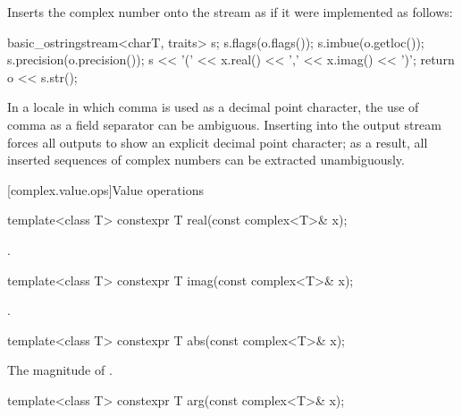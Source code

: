 \begin{itemdescr}
\pnum
\effects
Inserts the complex number 
onto the stream  as if it were implemented as follows:

\begin{codeblock}
basic_ostringstream<charT, traits> s;
s.flags(o.flags());
s.imbue(o.getloc());
s.precision(o.precision());
s << '(' << x.real() << ',' << x.imag() << ')';
return o << s.str();
\end{codeblock}

\pnum
\begin{note}
In a locale in which comma is used as a decimal point character, the
use of comma as a field separator can be ambiguous. Inserting
 into the output stream forces all outputs to
show an explicit decimal point character; as a result, all inserted sequences of
complex numbers can be extracted unambiguously.
\end{note}
\end{itemdescr}

[complex.value.ops]{Value operations}

%
\begin{itemdecl}
template<class T> constexpr T real(const complex<T>& x);
\end{itemdecl}

\begin{itemdescr}
\pnum
\returns
{}.
\end{itemdescr}

%
\begin{itemdecl}
template<class T> constexpr T imag(const complex<T>& x);
\end{itemdecl}

\begin{itemdescr}
\pnum
\returns
{}.
\end{itemdescr}

%
\begin{itemdecl}
template<class T> constexpr T abs(const complex<T>& x);
\end{itemdecl}

\begin{itemdescr}
\pnum
\returns
The magnitude of .
\end{itemdescr}

%
\begin{itemdecl}
template<class T> constexpr T arg(const complex<T>& x);
\end{itemdecl}

